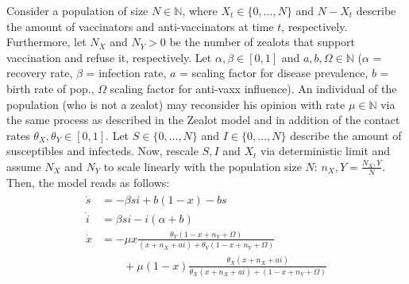 
\begin{model}[My model V1]
Consider a population of size $N \in \mathbb{N}$, where $X_t \in \lbrace 0,\dots,N\rbrace$ and $N-X_t$ describe the amount of vaccinators and anti-vaccinators at time $t$, respectively. Furthermore, let $N_X$ and $N_Y > 0$ be the number of zealots that support vaccination and refuse it, respectively. Let $\alpha,\beta \in \left[0,1\right]$ and $a,b, \Omega \in \mathbb{N}$ ($\alpha$ = recovery rate, $\beta$ = infection rate, $a$ = scaling factor for disease prevalence, $b$ = birth rate of pop., $\Omega$ scaling factor for anti-vaxx influence). An individual of the population (who is not a zealot) may reconsider his opinion with rate $\mu \in \mathbb{N}$ via the same process as described in the Zealot model and in addition of the contact rates $\theta_X, \theta_Y \in \left[0,1\right]$. Let $S \in \lbrace 0,\dots,N\rbrace$ and $I \in  \lbrace 0,\dots,N\rbrace$ describe the amount of susceptibles and infecteds. Now, rescale $S,I$ and $X_t$ via deterministic limit and assume $N_X$ and $N_Y$ to scale linearly with the population size $N$: $n_X,Y = \frac{N_X,Y}{N}$. Then, the model reads as follows:
	\begin{align}
		\begin{split}
			\dot{s} &= -\beta si + b\left(1-x\right) - bs\\
			\dot{i} &= \beta si - i\left(\alpha + b\right)\\
			\dot{x} &= -\mu x\frac{\theta_Y(1-x+n_Y+\Omega)}{(x+n_X+ai) + \theta_Y(1-x+n_Y+\Omega)}\\
			&\qquad+ \mu \left(1-x\right)\frac{\theta_X (x+ n_X+ ai)}{\theta_X (x + n_X + ai) + (1-x + n_Y + \Omega)}
		\end{split}
	\end{align}
\end{model}

